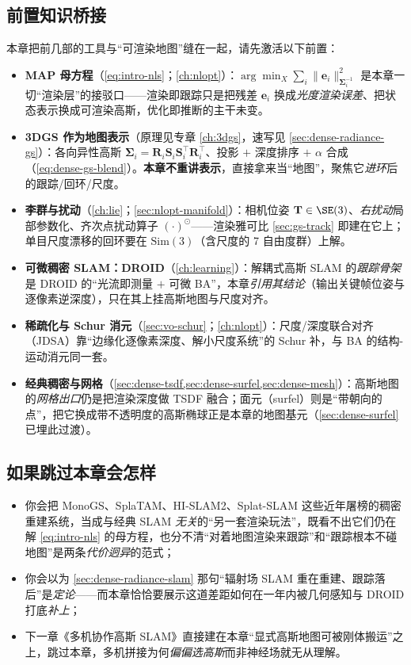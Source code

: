 \subsection*{前置知识桥接}
本章把前几部的工具与“可渲染地图”缝在一起，请先激活以下前置：
\begin{itemize}
  \item \textbf{MAP 母方程}（\cref{eq:intro-nls}；\cref{ch:nlopt}）：$\arg\min_X\sum_i\|\mathbf{e}_i\|^2_{\boldsymbol\Sigma_i^{-1}}$ 是本章一切“渲染层”的接驳口——渲染即跟踪只是把残差 $\mathbf{e}_i$ 换成\emph{光度渲染误差}、把状态表示换成可渲染高斯，优化即推断的主干未变。
  \item \textbf{3DGS 作为地图表示}（原理见专章 \cref{ch:3dgs}，速写见 \cref{sec:dense-radiance-gs}）：各向异性高斯 $\boldsymbol\Sigma_i=\mathbf{R}_i\mathbf{S}_i\mathbf{S}_i^\top\mathbf{R}_i^\top$、投影 $+$ 深度排序 $+$ $\alpha$ 合成（\cref{eq:dense-gs-blend}）。\textbf{本章不重讲表示}，直接拿来当“地图”，聚焦它\emph{进环}后的跟踪/回环/尺度。
  \item \textbf{李群与扰动}（\cref{ch:lie}；\cref{sec:nlopt-manifold}）：相机位姿 $\mathbf{T}\in\SE(3)$、\emph{右扰动}局部参数化、齐次点扰动算子 $(\cdot)^\odot$——渲染雅可比 \cref{sec:gs-track} 即建在它上；单目尺度漂移的回环要在 $\mathrm{Sim}(3)$（含尺度的 7 自由度群）上解。
  \item \textbf{可微稠密 SLAM：DROID}（\cref{ch:learning}）：解耦式高斯 SLAM 的\emph{跟踪骨架}是 DROID 的“光流即测量 $+$ 可微 BA”，本章\emph{引用其结论}（输出关键帧位姿与逐像素逆深度），只在其上挂高斯地图与尺度对齐。
  \item \textbf{稀疏化与 Schur 消元}（\cref{sec:vo-schur}；\cref{ch:nlopt}）：尺度/深度联合对齐（JDSA）靠“边缘化逐像素深度、解小尺度系统”的 Schur 补，与 BA 的结构-运动消元同一套。
  \item \textbf{经典稠密与网格}（\cref{sec:dense-tsdf,sec:dense-surfel,sec:dense-mesh}）：高斯地图的\emph{网格出口}仍是把渲染深度做 TSDF 融合；面元（surfel）则是“带朝向的点”，把它换成带不透明度的高斯椭球正是本章的地图基元（\cref{sec:dense-surfel} 已埋此过渡）。
\end{itemize}

\subsection*{如果跳过本章会怎样}
\begin{itemize}
  \item 你会把 MonoGS、SplaTAM、HI-SLAM2、Splat-SLAM 这些近年屠榜的稠密重建系统，当成与经典 SLAM \emph{无关}的“另一套渲染玩法”，既看不出它们仍在解 \cref{eq:intro-nls} 的母方程，也分不清“对着地图渲染来跟踪”和“跟踪根本不碰地图”是两条\emph{代价迥异}的范式；
  \item 你会以为 \cref{sec:dense-radiance-slam} 那句“辐射场 SLAM 重在重建、跟踪落后”是\emph{定论}——而本章恰恰要展示这道差距如何在一年内被几何感知与 DROID 打底\emph{补上}；
  \item 下一章《多机协作高斯 SLAM》直接建在本章“显式高斯地图可被刚体搬运”之上，跳过本章，多机拼接为何\emph{偏偏选高斯}而非神经场就无从理解。
\end{itemize}

